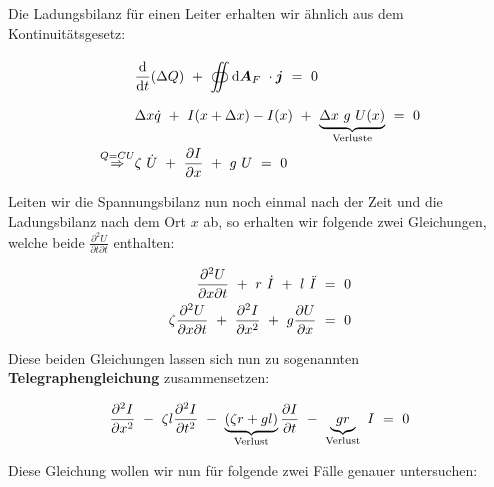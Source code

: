 Die Ladungsbilanz für einen Leiter erhalten wir ähnlich aus dem Kontinuitätsgesetz:

\begin{align*}
& \diff{}{t}(\Delta Q) \ + \ \Oiint{}{}{\vec{A}_F}\cdot\vec{j} \ = \ 0\\
& \Delta x \dot{q} \ + \ I(x+\Delta x)-I(x) \ + \ \underbrace{\Delta x \ g \ U(x)}_{\text{Verluste}} \ = \ 0\\
\overset{Q=CU}{\Rightarrow} & \zeta \ \dot{U} \ + \ \pdiff{I}{x} \ + \ g \ U  \ = \ 0
\end{align*}


Leiten wir die Spannungsbilanz nun noch einmal nach der Zeit und die  Ladungsbilanz nach dem Ort $x$ ab, so erhalten wir folgende zwei Gleichungen, welche beide $\frac{\partial^2 U}{\partial t \partial t}$ enthalten:

\begin{align*}
\frac{\partial^2 U}{\partial x \partial t} \ + \ r \ \dot{I} \ + \ l \ \ddot{I}  \ &= \ 0\\
\zeta\frac{\partial^2 U}{\partial x \partial t} \ + \ \pddiff{I}{x} \ + \ g \pdiff{U}{x}  \ &= \ 0
\end{align*}

Diese beiden Gleichungen lassen sich nun zu sogenannten \textbf{Telegraphengleichung} zusammensetzen:

\begin{equation*}
\frac{\partial ^2{I}}{\partial{x}^2} \ - \ \zeta l \frac{\partial ^2{I}}{\partial{t}^2} \ - \ \underbrace{\left(\zeta r + g l \right)}_{\text{Verlust}}\frac{\partial{I}}{\partial{t}} \ - \ \underbrace{g r}_{\text{Verlust}} \ I \ = \ 0
\end{equation*}


Diese Gleichung wollen wir nun für folgende zwei Fälle genauer untersuchen:

